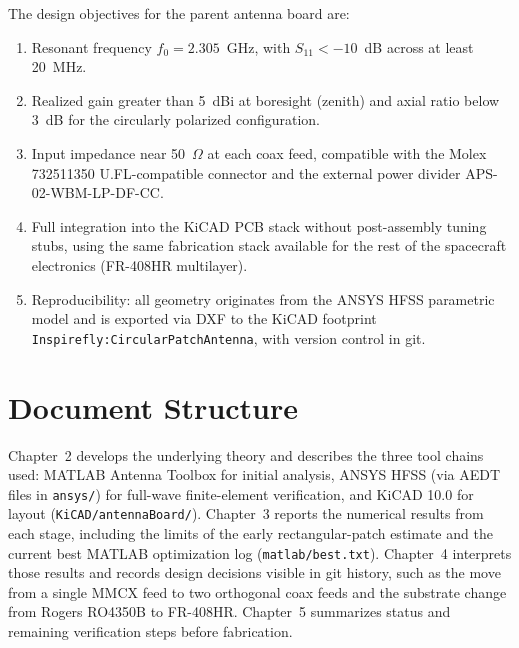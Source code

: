 The design objectives for the parent antenna board are:

\begin{enumerate}[noitemsep]
    \item Resonant frequency $f_0 = 2.305$~GHz, with $S_{11} < -10$~dB across at least 20~MHz.
    \item Realized gain greater than 5~dBi at boresight (zenith) and axial ratio below 3~dB for the circularly polarized configuration.
    \item Input impedance near 50~$\Omega$ at each coax feed, compatible with the Molex 732511350 U.FL-compatible connector and the external power divider APS-02-WBM-LP-DF-CC.
    \item Full integration into the KiCAD PCB stack without post-assembly tuning stubs, using the same fabrication stack available for the rest of the spacecraft electronics (FR-408HR multilayer).
    \item Reproducibility: all geometry originates from the ANSYS HFSS parametric model and is exported via DXF to the KiCAD footprint \texttt{Inspirefly:CircularPatchAntenna}, with version control in git.
\end{enumerate}

\section{Document Structure}

Chapter~2 develops the underlying theory and describes the three tool chains used: MATLAB Antenna Toolbox for initial analysis, ANSYS HFSS (via AEDT files in \texttt{ansys/}) for full-wave finite-element verification, and KiCAD 10.0 for layout (\texttt{KiCAD/antennaBoard/}). Chapter~3 reports the numerical results from each stage, including the limits of the early rectangular-patch estimate and the current best MATLAB optimization log (\texttt{matlab/best.txt}). Chapter~4 interprets those results and records design decisions visible in git history, such as the move from a single MMCX feed to two orthogonal coax feeds and the substrate change from Rogers RO4350B to FR-408HR. Chapter~5 summarizes status and remaining verification steps before fabrication.


